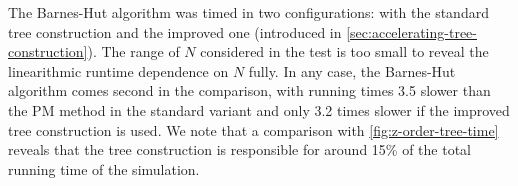 The Barnes-Hut algorithm was timed in two configurations: with the standard tree construction and the improved one (introduced in \autoref{sec:accelerating-tree-construction}).
The range of $ N $ considered in the test is too small to reveal the linearithmic runtime dependence on $ N $ fully.
In any case, the Barnes-Hut algorithm comes second in the comparison, with running times 3.5 slower than the PM method in the standard variant and only 3.2 times slower if the improved tree construction is used.
We note that a comparison with \autoref{fig:z-order-tree-time} reveals that the tree construction is responsible for around 15\% of the total running time of the simulation.